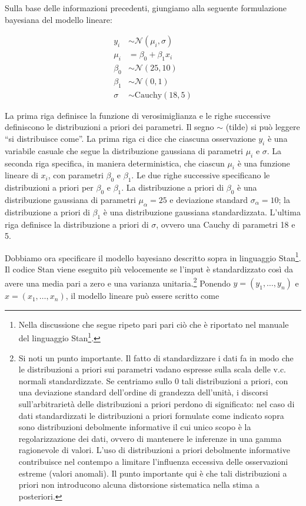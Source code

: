 \documentclass[
  11pt,
]{krantz}
\renewcommand{\href}[2]{#2\footnote{\url{#1}}}
\begin{document}
Sulla base delle informazioni precedenti, giungiamo alla seguente formulazione bayesiana del modello lineare:

\[
\begin{aligned}
y_i &\sim \mathcal{N}(\mu_i, \sigma) \\
\mu_i &= \beta_0 + \beta_1 x_i \\
\beta_0 &\sim \mathcal{N}(25, 10) \\
\beta_1 &\sim \mathcal{N}(0, 1) \\
\sigma &\sim \text{Cauchy}(18, 5) 
\end{aligned}
\]

La prima riga definisce la funzione di verosimiglianza e le righe successive definiscono le distribuzioni a priori dei parametri. Il segno \(\sim\) (tilde) si può leggere ``si distribuisce come''. La prima riga ci dice che ciascuna osservazione \(y_i\) è una variabile casuale che segue la distribuzione gaussiana di parametri \(\mu_i\) e \(\sigma\). La seconda riga specifica, in maniera deterministica, che ciascun \(\mu_i\) è una funzione lineare di \(x_i\), con parametri \(\beta_0\) e \(\beta_1\). Le due righe successive specificano le distribuzioni a priori per \(\beta_0\) e \(\beta_1\). La distribuzione a priori di \(\beta_0\) è una distribuzione gaussiana di parametri \(\mu_{\alpha} = 25\) e deviazione standard \(\sigma_{\alpha} = 10\); la distribuzione a priori di \(\beta_1\) è una distribuzione gaussiana standardizzata. L'ultima riga definisce la distribuzione a priori di \(\sigma\), ovvero una Cauchy di parametri 18 e 5.

Dobbiamo ora specificare il modello bayesiano descritto sopra in linguaggio Stan\footnote{Nella discussione che segue ripeto pari pari ciò che è riportato nel manuale del linguaggio \href{https://mc-stan.org/docs/2_27/stan-users-guide/standardizing-predictors-and-outputs.html}{Stan}.}. Il codice Stan viene eseguito più velocemente se l'input è standardizzato così da avere una media pari a zero e una varianza unitaria.\footnote{Si noti un punto importante. Il fatto di standardizzare i dati fa in modo che le distribuzioni a priori sui parametri vadano espresse sulla scala delle v.c. normali standardizzate. Se centriamo sullo 0 tali distribuzioni a priori, con una deviazione standard dell'ordine di grandezza dell'unità, i discorsi sull'arbitrarietà delle distribuzioni a priori perdono di significato: nel caso di dati standardizzati le distribuzioni a priori formulate come indicato sopra sono distribuzioni debolmente informative il cui unico scopo è la regolarizzazione dei dati, ovvero di mantenere le inferenze in una gamma ragionevole di valori. L'uso di distribuzioni a priori debolmente informative contribuisce nel contempo a limitare l'influenza eccessiva delle osservazioni estreme (valori anomali). Il punto importante qui è che tali distribuzioni a priori non introducono alcuna distorsione sistematica nella stima a posteriori.} Ponendo \(y = (y_1, \dots, y_n)\) e \(x = (x_1, \dots, x_n)\), il modello lineare può essere scritto come
\end{document}
